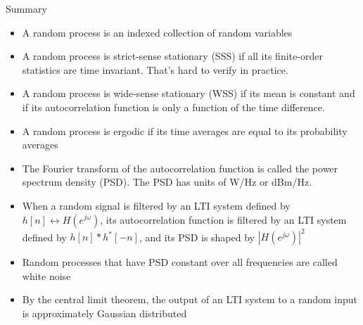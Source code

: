 \documentclass[10pt]{beamer}
\begin{document}
\begin{frame}{Summary}
\begin{itemize}
	\item A random process is an indexed collection of random variables
	\item A random process is strict-sense stationary (SSS) if all its finite-order statistics are time invariant. That's hard to verify in practice.
	\item A random process is wide-sense stationary (WSS) if its mean is constant and if its autocorrelation function is only a function of the time difference. 
	\item A random process is ergodic if its time averages are equal to its probability averages
	\item The Fourier transform of the autocorrelation function is called the power spectrum density (PSD). The PSD has units of W/Hz or dBm/Hz.
	\item When a random signal is filtered by an LTI system defined by $h[n]\leftrightarrow H(e^{j\omega})$, its autocorrelation function is filtered by an LTI system defined by $h[n]\ast h^*[-n]$, and its PSD is shaped by $|H(e^{j\omega})|^2$
	\item Random processes that have PSD constant over all frequencies are called white noise
	\item By the central limit theorem, the output of an LTI system to a random input is approximately Gaussian distributed
	
\end{itemize}
\end{frame}
\end{document}
